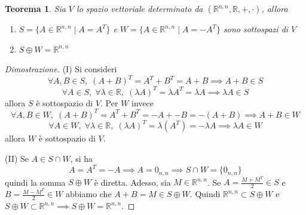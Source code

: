 \documentclass{article}
\newtheorem{theorem}{Teorema}
\begin{document}
    \vspace{10pt}
    \begin{theorem}
        Sia $V$ lo spazio vettoriale determinato da $(\mathbb{R}^{n, n}, \mathbb{R}, +, \cdot)$, allora 
        \begin{enumerate}[label=(\Roman*)]
            \item $S = \{A \in \mathbb{R}^{n, n} \; | \; A = A^{T}\}$ e $W = \{A \in \mathbb{R}^{n, n} \; | \; A = -A^{T}\}$ sono sottospazi di $V$
            \item $S \oplus W = \mathbb{R}^{n, n}$
        \end{enumerate}
         
    \end{theorem}
    \begin{proof}[Dimostrazione]
        (I) Si consideri 
        \[
            \forall A, B \in S, \; (A + B)^{T} = A^T + B^T = A + B \implies A + B \in S
        \] 
        \[
            \forall A \in S, \; \forall \lambda \in \mathbb{R}, \; (\lambda A)^T = \lambda A^T = \lambda A \implies \lambda A \in S
        \]
        allora $S$ è sottospazio di $V$. Per $W$ invece
        \[
            \forall A, B \in W, \; (A + B)^{T} = A^T + B^T = -A + -B = -(A + B) \implies A + B \in W
        \]
        \[
            \forall A \in W, \; \forall \lambda \in \mathbb{R}, \; (\lambda A)^T = \lambda (A^T) = - \lambda A \implies \lambda A \in W
        \]
        allora $W$ è sottospazio di $V$.

        \vspace{10pt}
        (II) Se $A \in S \cap W$, si ha 
        \[
            A = A^T = -A \implies A = 0_{n, n} \implies S \cap W = \{0_{n, n}\}
        \]
        quindi la somma $S \oplus W$ è diretta. Adesso, sia $M \in \mathbb{R}^{n, n}$. Se $A = \frac{M + M^{T}}{2} \in S$ e $B = \frac{M - M^{T}}{2} \in W$ abbiamo che $A + B = M \in S \oplus W$. Quindi $\mathbb{R}^{n, n} \subset S \oplus W$ e $S \oplus W \subset \mathbb{R}^{n, n} \implies S \oplus W = \mathbb{R}^{n, n}$.
    \end{proof}
\end{document}
